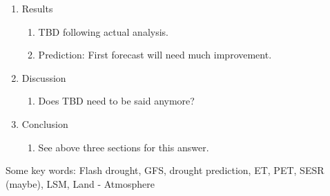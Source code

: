 \documentclass[12pt, letterpaper]{article}
\begin{document}
\begin{enumerate}
    \item Results
      \begin{enumerate}
        \item TBD following actual analysis.
        \item Prediction: First forecast will need much improvement.
      \end{enumerate}
    
    \item Discussion
      \begin{enumerate}
        \item Does TBD need to be said anymore?
      \end{enumerate}

    \item Conclusion
    \begin{enumerate}
      \item See above three sections for this answer.
    \end{enumerate}
    
  \end{enumerate}
  
  Some key words: Flash drought, GFS, drought prediction, ET, PET, SESR (maybe), LSM,
  Land - Atmosphere
\end{document}
